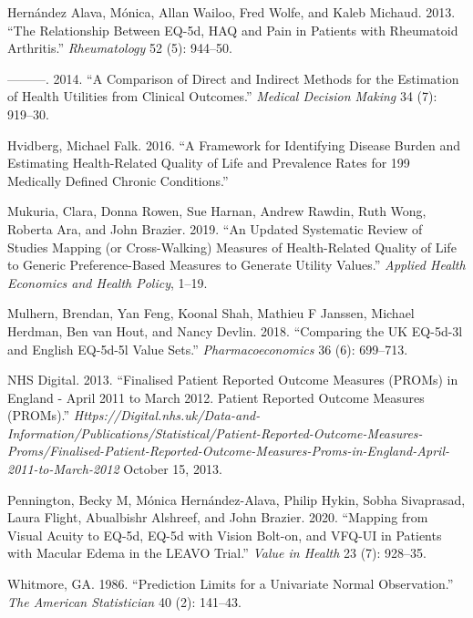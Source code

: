\documentclass[
]{article}
\newlength{\cslhangindent}
\newenvironment{CSLReferences}[2] %
 {%
  \setlength{\parindent}{0pt}
  \ifodd #1 \everypar{\setlength{\hangindent}{\cslhangindent}}\ignorespaces\fi
  \ifnum #2 > 0
  \setlength{\parskip}{#2\baselineskip}
  \fi
 }%
 {}
\begin{document}
\begin{CSLReferences}{1}{0}
\leavevmode{}%
Hernández Alava, Mónica, Allan Wailoo, Fred Wolfe, and Kaleb Michaud. 2013. {``The Relationship Between {EQ-5d}, {HAQ} and Pain in Patients with Rheumatoid Arthritis.''} \emph{Rheumatology} 52 (5): 944--50.

\leavevmode{}%
---------. 2014. {``A Comparison of Direct and Indirect Methods for the Estimation of Health Utilities from Clinical Outcomes.''} \emph{Medical Decision Making} 34 (7): 919--30.

\leavevmode{}%
Hvidberg, Michael Falk. 2016. {``A Framework for Identifying Disease Burden and Estimating Health-Related Quality of Life and Prevalence Rates for 199 Medically Defined Chronic Conditions.''}

\leavevmode{}%
Mukuria, Clara, Donna Rowen, Sue Harnan, Andrew Rawdin, Ruth Wong, Roberta Ara, and John Brazier. 2019. {``An Updated Systematic Review of Studies Mapping (or Cross-Walking) Measures of Health-Related Quality of Life to Generic Preference-Based Measures to Generate Utility Values.''} \emph{Applied Health Economics and Health Policy}, 1--19.

\leavevmode{}%
Mulhern, Brendan, Yan Feng, Koonal Shah, Mathieu F Janssen, Michael Herdman, Ben van Hout, and Nancy Devlin. 2018. {``Comparing the UK EQ-5d-3l and English EQ-5d-5l Value Sets.''} \emph{Pharmacoeconomics} 36 (6): 699--713.

\leavevmode{}%
NHS Digital. 2013. {``Finalised Patient Reported Outcome Measures (PROMs) in England - April 2011 to March 2012. Patient Reported Outcome Measures (PROMs).''} \emph{Https://Digital.nhs.uk/Data-and-Information/Publications/Statistical/Patient-Reported-Outcome-Measures-Proms/Finalised-Patient-Reported-Outcome-Measures-Proms-in-England-April-2011-to-March-2012} October 15, 2013.

\leavevmode{}%
Pennington, Becky M, Mónica Hernández-Alava, Philip Hykin, Sobha Sivaprasad, Laura Flight, Abualbishr Alshreef, and John Brazier. 2020. {``Mapping from Visual Acuity to EQ-5d, EQ-5d with Vision Bolt-on, and VFQ-UI in Patients with Macular Edema in the LEAVO Trial.''} \emph{Value in Health} 23 (7): 928--35.

\leavevmode{}%
Whitmore, GA. 1986. {``Prediction Limits for a Univariate Normal Observation.''} \emph{The American Statistician} 40 (2): 141--43.


\end{CSLReferences}
\end{document}
